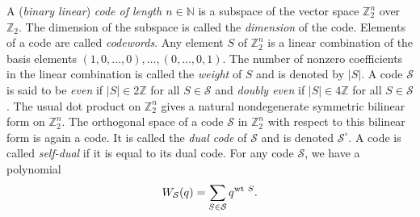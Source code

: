 \documentclass{amsproc}
\theoremstyle{definition}
\theoremstyle{remark}
\newcommand{\swt}{\mbox{\rm {\scriptsize wt}}\ }
\numberwithin{equation}{section}
\begin{document}
A ({\it binary linear}) {\it code of length $n\in \mathbb{N}$} is a subspace
of the vector space $\mathbb{Z}_{2}^{n}$ over $\mathbb{Z}_{2}$. The
dimension of the subspace is called the {\it dimension} of the
code. Elements of a code are called {\it codewords}. Any element $S$
of $\mathbb{Z}_{2}^{n}$ is a linear combination of the basis elements
$(1, 0, \dots, 0), \dots, (0, \dots, 0, 1)$.  The number of nonzero
coefficients in the linear combination is called the {\it weight} of
$S$ and is denoted by $|S|$. A code $\mathcal{S}$ is said to be {\it
even} if $|S|\in 2\mathbb{Z}$ for all $S\in \mathcal{S}$ and {\it
doubly even} if $|S|\in 4\mathbb{Z}$ for all $S\in \mathcal{S}$. The
usual dot product on $\mathbb{Z}_{2}^{n}$ gives a natural nondegenerate
symmetric bilinear form on $\mathbb{Z}_{2}^{n}$.  The orthogonal space of a
code $\mathcal{S}$ in $\mathbb{Z}_{2}^{n}$ with respect to this
bilinear form is again a code. It is called the {\it dual code} of
$\mathcal{S}$ and is denoted $\mathcal{S}^{\circ}$. A code is called
{\it self-dual} if it is equal to its dual code.
For any code $\mathcal{S}$, we have a polynomial
$$W_{\mathcal{S}}(q)=\sum_{S\in \mathcal{S}}q^{\swt S}.$$
\end{document}
